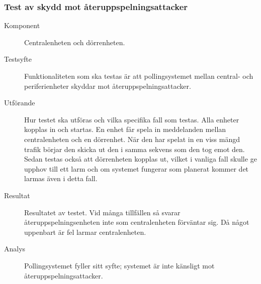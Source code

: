 \documentclass[a4paper]{article}
\begin{document}
\subsubsection{Test av skydd mot återuppspelningsattacker}
\begin{description}
\item[Komponent] Centralenheten och dörrenheten.

\item[Testsyfte] Funktionaliteten som ska testas är att pollingsystemet mellan central- och periferienheter skyddar mot återuppspelningsattacker.

\item[Utförande] Hur testet ska utföras och vilka specifika fall som testas.
Alla enheter kopplas in och startas.
En enhet får spela in meddelanden mellan centralenheten och en dörrenhet.
När den har spelat in en viss mängd trafik börjar den skicka ut den i samma sekvens som den tog emot den.
Sedan testas också att dörrenheten kopplas ut, vilket i vanliga fall skulle ge upphov till ett larm och om systemet fungerar som planerat kommer det larmas även i detta fall.

\item[Resultat] Resultatet av testet. Vid många tillfällen så svarar återuppspelningsenheten inte som centralenheten förväntar sig.
Då något uppenbart är fel larmar centralenheten.

\item[Analys] Pollingsystemet fyller sitt syfte; systemet är inte känsligt mot återuppspelningsattacker.
\end{description}
\end{document}

